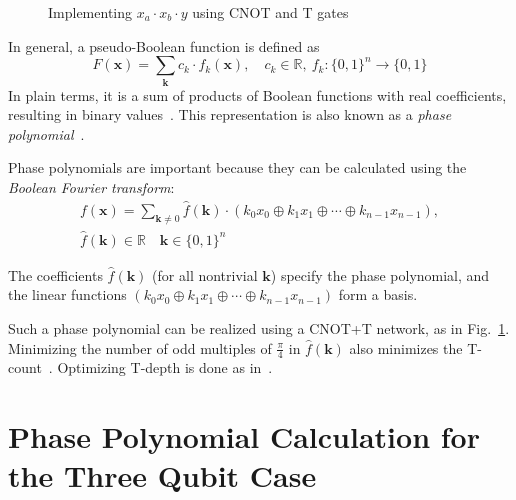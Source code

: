 \documentclass[a4paper]{article}
\begin{document}
\begin{figure}[t]
  \centering
  \scalebox{0.7} {
    
  }
  \caption{Implementing $x_a \cdot x_b \cdot y$ using CNOT and T gates}
  \label{fig-toff-mark}
\end{figure}

\vspace{0.3cm}

In general, a pseudo-Boolean function is defined as
\begin{equation}
  \label{eq-pseudo-boolean}
  F(\mathbf{x}) = \sum_{\mathbf{k}} c_k \cdot f_k(\mathbf{x}), \quad c_k \in \mathbb{R},\ f_k : \{0,1\}^n \to \{0,1\}
\end{equation}
In plain terms, it is a sum of products of Boolean functions with real coefficients, resulting in binary values~\cite{bib-barenco-elementary}. This representation is also known as a {\it phase polynomial}~\cite{bib-amy-cnot}.

\vspace{0.5cm}

Phase polynomials are important because they can be calculated using the {\it Boolean Fourier transform}:
\begin{equation}
  \begin{aligned}
    \label{eq-boolean-fourier}
    f(\mathbf{x}) = \sum_{\mathbf{k} \neq 0} \hat{f}(\mathbf{k}) \cdot ( k_0 x_0 \oplus k_1 x_1 \oplus \cdots \oplus k_{n-1} x_{n-1}), \\\nonumber
    \hat{f}(\mathbf{k}) \in \mathbb{R} \quad \mathbf{k} \in \{0,1\}^{n}
  \end{aligned}
\end{equation}

\vspace{0.3cm}

The coefficients $\hat{f}(\mathbf{k})$ (for all nontrivial $\mathbf{k}$) specify the phase polynomial, and the linear functions $( k_0 x_0 \oplus k_1 x_1 \oplus \cdots \oplus k_{n-1} x_{n-1})$ form a basis.

Such a phase polynomial can be realized using a CNOT+T network, as in Fig.~\ref{fig-toff-mark}. Minimizing the number of odd multiples of $\frac{\pi}{4}$ in $\hat{f}(\mathbf{k})$ also minimizes the T-count~\cite{bib-amy-rm}. Optimizing T-depth is done as in~\cite{bib-amy-matroid}.

\vspace{0.4cm}

\section{Phase Polynomial Calculation for the Three Qubit Case}
\label{Chap:Bool-pbool3q}
\end{document}
